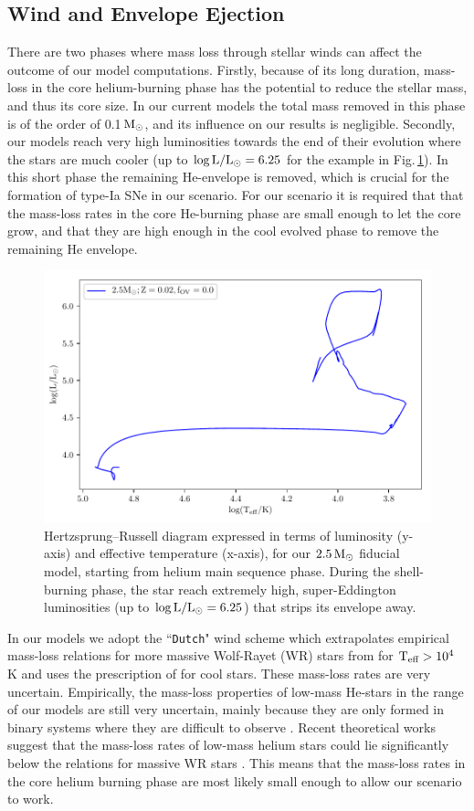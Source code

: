 \documentclass[../../main/thesis_msc.tex]{subfiles}
\begin{document}
    \subsection{Wind and Envelope Ejection} \label{sec:wind}
There are two phases where mass loss through stellar winds can affect the outcome of our model computations. Firstly, because of its long duration, mass-loss in the core helium-burning phase has the potential to reduce the stellar mass, and thus its core size. In our current models the total mass removed in this phase is of the order of 0.1\,$\rm M_\odot$, and its influence on our results is negligible. Secondly, our models reach very high luminosities towards the end of their evolution where the stars are much cooler (up to $\rm \log{L/L_\odot = 6.25}$ for the example in Fig.\,\ref{fig:HRD}). In this short phase the remaining He-envelope is removed, which is crucial for the formation of type-Ia SNe in our scenario. For our scenario it is required that that the mass-loss rates in the core He-burning phase are small enough to let the core grow, and that they are high enough in the cool evolved phase to remove the remaining He envelope.

    \begin{figure}[h!]
        \centering
        \includegraphics[width=0.6\columnwidth]{../figures/chapter4/HRD.pdf}
        \caption{Hertzsprung–Russell diagram expressed in terms of luminosity (y-axis) and effective temperature (x-axis), for our $\rm 2.5\, M_{\odot}$ fiducial model, starting from helium main sequence phase. During the shell-burning phase, the star reach extremely high, super-Eddington luminosities (up to $\rm \log L/L_{\odot} = 6.25$) that strips its envelope away.}
        \label{fig:HRD}
    \end{figure}


In our models we adopt the ``\texttt{Dutch}" \mesa wind scheme which extrapolates empirical mass-loss relations for more massive Wolf-Rayet (WR) stars from \cite{Nugis2000} for $\rm T_{\text{eff}} > 10^4$ K and uses the prescription of \cite{deJager1988} for cool stars. These mass-loss rates are very uncertain. Empirically, the mass-loss properties of low-mass He-stars in the range of our models are still very uncertain, mainly because they are only formed in binary systems where they are difficult to observe \citep{Smith2017,Zapartas2017}. Recent theoretical works suggest that the mass-loss rates of low-mass helium stars could lie significantly below the relations for massive WR stars \citep{Graefener2017,Vink2017}. This means that the mass-loss rates in the core helium burning phase are most likely small enough to allow our scenario to work.
        
\end{document}
